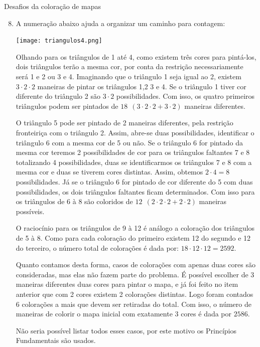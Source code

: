 \begin{answer}{Desafios da coloração de mapas}
{
\begin{enumerate}[wide]\setcounter{enumi}{7}\small

\item A numeração abaixo ajuda a organizar um caminho para contagem: 
\begin{center}
\texttt{[image: triangulos4.png]}  
\end{center}

Olhando para os triângulos de 1 até 4, como existem três cores para pintá-los, dois triângulos terão a mesma cor, por conta da restrição necessariamente será 1 e 2 ou 3 e 4. Imaginando que o triângulo 1 seja igual ao 2, existem $3 \cdot 2\cdot 2 $ maneiras de pintar os triângulos 1,2 3 e 4.  Se o triângulo 1 tiver cor  diferente do triângulo 2 são $3\cdot2 $ possibilidades. Com isso, os quatro primeiros triângulos podem ser pintados de $18 ~~ (3 \cdot 2\cdot 2 +3\cdot2)$ maneiras diferentes. 

O triângulo 5 pode ser pintado de 2 maneiras diferentes, pela restrição fronteiriça com o triângulo 2. Assim, abre-se duas possibilidades, identificar o triângulo 6 com a mesma cor de 5 ou não. Se o triângulo 6 for pintado da mesma cor teremos 2 possibilidades de cor para os triângulos faltantes 7 e 8 totalizando 4 possibilidades, duas se identificarmos os triângulos 7 e 8 com a mesma cor e duas se tiverem cores distintas. Assim, obtemos $2 \cdot 4 = 8$ possibilidades. Já se o triângulo 6 for pintado de cor diferente do 5 com duas possibilidades, os dois triângulos faltantes ficam determinados. Com isso para os triângulos de 6 à 8 são coloridos de $ 12~ ~ (2 \cdot 2 \cdot 2+ 2 \cdot 2)$ maneiras possíveis. 

O raciocínio para os triângulos de 9 à 12 é análogo a coloração dos triângulos de 5 à 8. Como para cada coloração do primeiro existem 12 do segundo e 12 do terceiro, o número total de colorações é dada por: $18 \cdot 12 \cdot 12 = 2592$.


Quanto contamos desta forma, casos de colorações com apenas duas cores são consideradas, mas elas não fazem parte do problema. É possível escolher de 3 maneiras diferentes duas cores para pintar o mapa, e já foi feito no item anterior que com 2 cores existem 2 colorações distintas. Logo foram contados 6 colorações a mais que devem ser retiradas do total. Com isso, o número de maneiras de colorir o mapa inicial com exatamente 3 cores é dada por $2586.$ 

Não seria possível listar todos esses casos, por este motivo os Princípios Fundamentais são usados. 


\end{enumerate}}
\end{answer}
